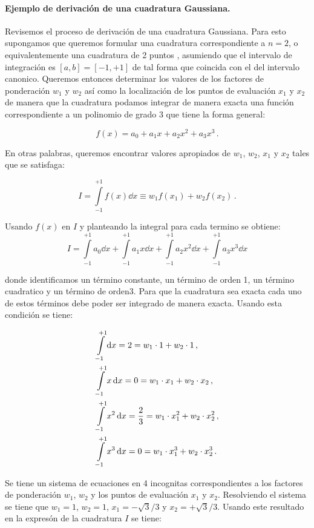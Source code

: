 \paragraph*{Ejemplo de derivación de una cuadratura Gaussiana.}
Revisemos el proceso de derivación de una cuadratura Gaussiana. Para esto supongamos que queremos formular una cuadratura correspondiente a $n=2$, o equivalentemente una cuadratura de 2 puntos , asumiendo que el intervalo de integración es $[a,b]=[-1,+1]$ de tal forma que coincida con el del intervalo canonico. Queremos entonces determinar los valores de los factores de ponderación $w_1$ y $w_2$ así como la localización de los puntos de evaluación $x_1$ y $x_2$ de manera que la cuadratura podamos integrar de manera exacta una función correspondiente a un polinomio de grado $3$ que tiene la forma general:

\[f(x) = a_0 + a_1 x + a_2 x^2 + a_3 x^3\, .\]

En otras palabras, queremos encontrar valores apropiados de $w_1$, $w_2$, $x_1$ y $x_2$ tales que se satisfaga:

\[I = \int\limits_{-1}^{+1} f(x)\dd{x}  \equiv w_1 f(x_1) + w_2 f(x_2)\, .\]

Usando $f(x)$ en $I$ y planteando la integral para cada termino se obtiene:
\[I = \int\limits_{-1}^{+1} a_0 \dd{x}  + \int\limits_{-1}^{+1} a_1 x\dd{x}  + \int\limits_{-1}^{+1} a_2 x^2 \dd{x}  + \int\limits_{-1}^{+1} a_3 x^3 \dd{x} \]

donde identificamos un término constante, un término de orden 1, un término cuadratico y un término de orden3. Para que la cuadratura sea exacta cada uno de estos términos debe poder ser integrado de manera exacta. Usando esta condición se tiene:

\begin{align*}
  &\int\limits_{-1}^{+1} \dd{x}  = 2 = w_1 \cdot 1 + w_2 \cdot 1\, ,\\
  &\int\limits_{-1}^{+1} x\dd{x}  = 0 = w_1 \cdot x_1 + w_2 \cdot x_2\, ,\\
  &\int\limits_{-1}^{+1} x^2 \dd{x}  = \frac{2}{3} = w_1 \cdot x_1^2 + w_2 \cdot 
  x_2^2\, ,\\
  &\int\limits_{-1}^{+1} x^3 \dd{x}  = 0 = w_1 \cdot x_1^3 + w_2 \cdot x_2^3\, .
\end{align*}


Se tiene un sistema de  ecuaciones en 4 incognitas correspondientes a los factores de ponderación $w_1$, $w_2$ y los puntos de evaluación $x_1$ y $x_2$. Resolviendo el sistema se tiene que $w_1 = 1$, 
$w_2 = 1$, $x_1 =-\sqrt{3}/3$ y $x_2 =  + \sqrt{3}/3$. Usando este resultado en la expresón de la cuadratura $I$ se tiene:

